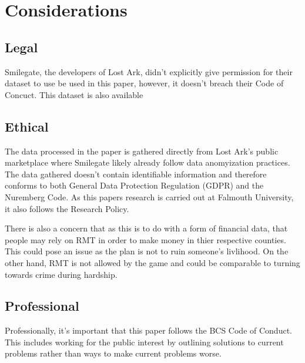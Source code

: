 \documentclass[journal]{IEEEtran}
\begin{document}
\section{Considerations}
\subsection{Legal}
\noindent Smilegate, the developers of Lost Ark, didn't explicitly give permission for their dataset to use be used in this paper, however, it doesn't breach their Code of Concuct\cite{AmazonGamesCOC}. This dataset is also available

\subsection{Ethical}
\noindent The data processed in the paper is gathered directly from Lost Ark's public marketplace where Smilegate likely already follow data anomyization practices\cite{Gruschka2018}. The data gathered doesn't contain identifiable information and therefore conforms to both General Data Protection Regulation (GDPR) and the Nuremberg Code\cite{Nuremberg1947}. As this papers research is carried out at Falmouth University, it also follows the Research Policy\cite{FalmouthEthicsPolicy2022}.

There is also a concern that as this is to do with a form of financial data, that people may rely on RMT in order to make money in thier respective counties. This could pose an issue as the plan is not to ruin someone's livlihood. On the other hand, RMT is not allowed by the game and could be comparable to turning towards crime during hardship.

\subsection{Professional}
\noindent Professionally, it's important that this paper follows the BCS Code of Conduct\cite{BCSCodeOfConduct2022}. This includes working for the public interest by outlining solutions to current problems rather than ways to make current problems worse.
\end{document}

